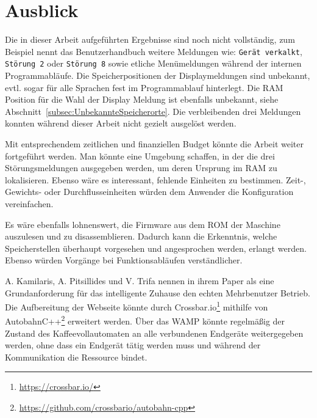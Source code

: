 \section{Ausblick}
Die in dieser Arbeit aufgeführten Ergebnisse sind noch nicht vollständig, zum Beispiel nennt das Benutzerhandbuch weitere Meldungen wie:\label{FehlendeMeldungen}
\texttt{Gerät verkalkt}, \texttt{Störung 2} oder \texttt{Störung 8} sowie etliche Menümeldungen während der internen Programmabläufe.
Die Speicherpositionen der Displaymeldungen sind unbekannt, evtl. sogar für alle Sprachen fest im Programmablauf hinterlegt.
Die \ac{RAM} Position für die Wahl der Display Meldung ist ebenfalls unbekannt, siehe Abschnitt~\ref{subsec:UnbekannteSpeicherorte}. 
Die verbleibenden drei Meldungen konnten während dieser Arbeit nicht gezielt ausgelöst werden.

Mit entsprechendem zeitlichen und finanziellen Budget könnte die Arbeit weiter fortgeführt werden.
Man könnte eine Umgebung schaffen, in der die drei Störungsmeldungen ausgegeben werden, um deren Ursprung im \ac{RAM} zu lokalisieren.
Ebenso wäre es interessant, fehlende Einheiten zu bestimmen.
Zeit-, Gewichts- oder Durchflusseinheiten würden dem Anwender die Konfiguration vereinfachen.

Es wäre ebenfalls lohnenswert, die Firmware aus dem \ac{ROM} der Maschine auszulesen und zu disassemblieren.
Dadurch kann die Erkenntnis, welche Speicherstellen überhaupt vorgesehen und angesprochen werden, erlangt werden.
Ebenso würden Vorgänge bei Funktionsabläufen verständlicher.

A. Kamilaris, A. Pitsillides und V. Trifa nennen in ihrem Paper \cite{Kamilaris2011} als eine Grundanforderung für das intelligente Zuhause den echten Mehrbenutzer Betrieb.
Die Aufbereitung der Webseite könnte durch Crossbar.io\footnote{\url{https://crossbar.io/}} mithilfe von AutobahnC++\footnote{\url{https://github.com/crossbario/autobahn-cpp}} erweitert werden.
Über das \ac{WAMP} könnte regelmäßig der Zustand des Kaffeevollautomaten an alle verbundenen Endgeräte weitergegeben werden, ohne dass ein Endgerät tätig werden muss und während der Kommunikation die Ressource bindet.
